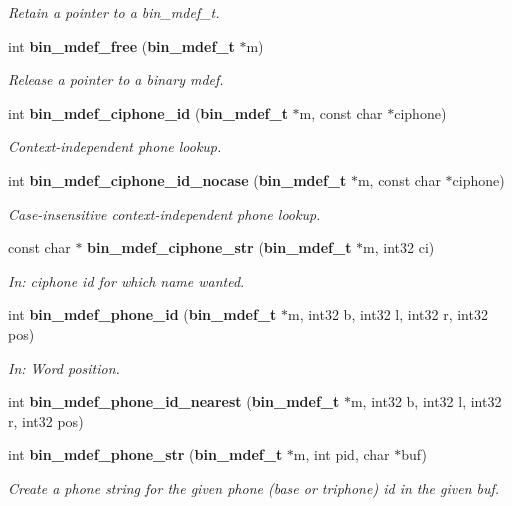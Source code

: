 \begin{DoxyCompactItemize}
\begin{DoxyCompactList}\small\item\em Retain a pointer to a bin\-\_\-mdef\-\_\-t. \end{DoxyCompactList}\item 
int {\bf bin\-\_\-mdef\-\_\-free} ({\bf bin\-\_\-mdef\-\_\-t} $\ast$m)\label{bin__mdef_8h_afe7ed87e2a2d22b228c14ed8225e4b2c}

\begin{DoxyCompactList}\small\item\em Release a pointer to a binary mdef. \end{DoxyCompactList}\item 
int {\bf bin\-\_\-mdef\-\_\-ciphone\-\_\-id} ({\bf bin\-\_\-mdef\-\_\-t} $\ast$m, const char $\ast$ciphone)
\begin{DoxyCompactList}\small\item\em Context-\/independent phone lookup. \end{DoxyCompactList}\item 
int {\bf bin\-\_\-mdef\-\_\-ciphone\-\_\-id\-\_\-nocase} ({\bf bin\-\_\-mdef\-\_\-t} $\ast$m, const char $\ast$ciphone)
\begin{DoxyCompactList}\small\item\em Case-\/insensitive context-\/independent phone lookup. \end{DoxyCompactList}\item 
const char $\ast$ {\bf bin\-\_\-mdef\-\_\-ciphone\-\_\-str} ({\bf bin\-\_\-mdef\-\_\-t} $\ast$m, int32 ci)
\begin{DoxyCompactList}\small\item\em In\-: ciphone id for which name wanted. \end{DoxyCompactList}\item 
int {\bf bin\-\_\-mdef\-\_\-phone\-\_\-id} ({\bf bin\-\_\-mdef\-\_\-t} $\ast$m, int32 b, int32 l, int32 r, int32 pos)
\begin{DoxyCompactList}\small\item\em In\-: Word position. \end{DoxyCompactList}\item 
int {\bfseries bin\-\_\-mdef\-\_\-phone\-\_\-id\-\_\-nearest} ({\bf bin\-\_\-mdef\-\_\-t} $\ast$m, int32 b, int32 l, int32 r, int32 pos)\label{bin__mdef_8h_a155bcd77cd4cd26d15c857b999a1fdae}

\item 
int {\bf bin\-\_\-mdef\-\_\-phone\-\_\-str} ({\bf bin\-\_\-mdef\-\_\-t} $\ast$m, int pid, char $\ast$buf)
\begin{DoxyCompactList}\small\item\em Create a phone string for the given phone (base or triphone) id in the given buf. \end{DoxyCompactList}\end{DoxyCompactItemize}
